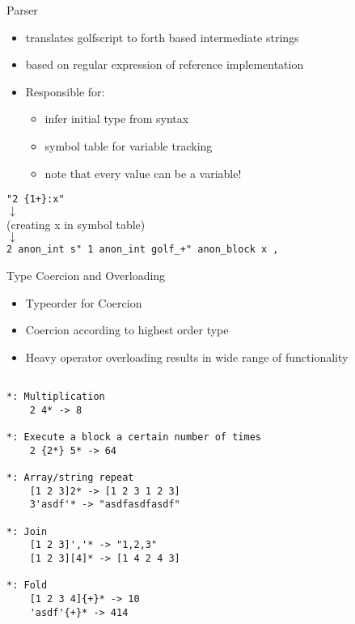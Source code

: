 \documentclass{beamer}
\begin{document}
\begin{frame}
    Parser
    \begin{itemize}
        \item translates golfscript to forth based intermediate strings
        \item based on regular expression of reference implementation 
        \item Responsible for:
        \begin{itemize}
            \item infer initial type from syntax
            \item symbol table for variable tracking
            \item note that every value can be a variable!
        \end{itemize}
    \end{itemize}



\begin{center}
    \small{    
\texttt{"2 \{1+\}:x"}  \\
$\downarrow$ \\
(creating x in symbol table) \\
$\downarrow$ \\
\texttt{2 anon\_int s" 1 anon\_int golf\_+" anon\_block x , }
}
\end{center}

\end{frame}





\begin{frame}
    Type Coercion and Overloading

    \begin{itemize}
        \item Typeorder for Coercion
        \item Coercion according to highest order type
        \item Heavy operator overloading results in wide range of functionality

    \end{itemize}
\end{frame}


\begin{frame}[fragile]

\small \begin{lstlisting}

*: Multiplication
    2 4* -> 8

*: Execute a block a certain number of times
    2 {2*} 5* -> 64

*: Array/string repeat
    [1 2 3]2* -> [1 2 3 1 2 3]
    3'asdf'* -> "asdfasdfasdf"

*: Join
    [1 2 3]','* -> "1,2,3"
    [1 2 3][4]* -> [1 4 2 4 3]

*: Fold
    [1 2 3 4]{+}* -> 10
    'asdf'{+}* -> 414

\end{lstlisting}

\end{frame}
\end{document}
